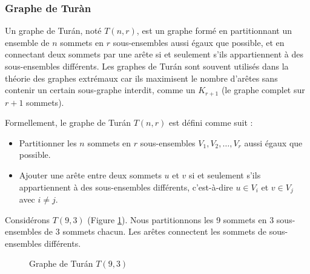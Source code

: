 \documentclass[12pt,a4paper]{article}
\begin{document}
\subsubsection*{Graphe de Turàn}
\label{subsubsec:turan}

Un graphe de Turán, noté \( T(n, r) \), est un graphe formé en partitionnant un ensemble de \( n \) sommets en \( r \) sous-ensembles aussi égaux que possible, et en connectant deux sommets par une arête si et seulement s'ils appartiennent à des sous-ensembles différents. Les graphes de Turán sont souvent utilisés dans la théorie des graphes extrémaux car ils maximisent le nombre d'arêtes sans contenir un certain sous-graphe interdit, comme un \( K_{r+1} \) (le graphe complet sur \( r+1 \) sommets).

Formellement, le graphe de Turán \( T(n, r) \) est défini comme suit :
\begin{itemize}
  \item Partitionner les \( n \) sommets en \( r \) sous-ensembles \( V_1, V_2, \ldots, V_r \) aussi égaux que possible.
  \item Ajouter une arête entre deux sommets \( u \) et \( v \) si et seulement s'ils appartiennent à des sous-ensembles différents, c'est-à-dire \( u \in V_i \) et \( v \in V_j \) avec \( i \neq j \).
\end{itemize}

Considérons \( T(9, 3) \) (Figure \ref{fig:turan}). Nous partitionnons les 9 sommets en 3 sous-ensembles de 3 sommets chacun. Les arêtes connectent les sommets de sous-ensembles différents.

\begin{figure}[h!]
  \centering
  \caption{Graphe de Turán \( T(9, 3) \)}
  \label{fig:turan}
\end{figure}
\end{document}
